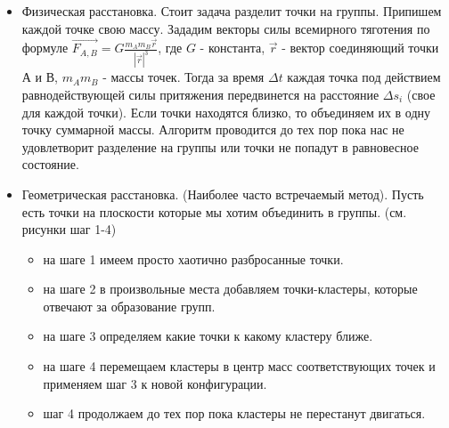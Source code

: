 \begin {itemize}
\item  Физическая расстановка.
Стоит задача разделит точки на группы. Припишем каждой точке свою массу. Зададим векторы силы всемирного тяготения по формуле 
$\vec{F_{A,B}} = G \frac{m_{A} m_{B}\vec{r}}{|\vec{r}|^3}$, где $G$ - константа, $\vec{r}$ - вектор соединяющий точки А и В, $m_{A} m_{B}$ - массы точек. Тогда за время $\Delta t$ каждая точка под действием равнодействующей силы притяжения передвинется на расстояние $\Delta s_i$ (свое для каждой точки). Если точки находятся близко, то объединяем их в одну точку суммарной массы. Алгоритм проводится до тех пор пока нас не удовлетворит разделение на группы или точки не попадут в равновесное состояние.  

\item Геометрическая расстановка. (Наиболее часто встречаемый метод). Пусть есть точки на плоскости которые мы хотим объединить в группы. (см. рисунки шаг 1-4)
\begin{itemize}
\item на шаге 1 имеем просто хаотично разбросанные точки.
\item на шаге 2 в произвольные места добавляем точки-кластеры, которые отвечают за образование групп.
\item на шаге 3 определяем какие точки к какому кластеру ближе.
\item на шаге 4 перемещаем кластеры в центр масс соответствующих точек и применяем шаг 3 к новой конфигурации.
\item шаг 4 продолжаем до тех пор пока кластеры не перестанут двигаться.
\end{itemize}


\end{itemize}
